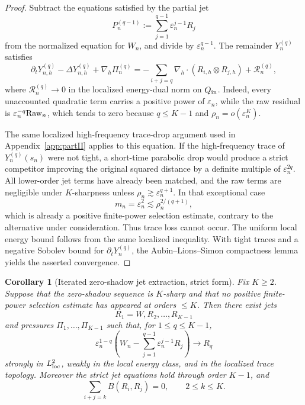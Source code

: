 \documentclass[11pt]{article}
\numberwithin{equation}{section}
\theoremstyle{plain}
\newtheorem{corollary}{Corollary}[section]
\theoremstyle{definition}
\theoremstyle{remark}
\newcommand{\nabh}{\nabla_h}
\newcommand{\calR}{\mathcal R}
\begin{document}
\begin{proof}
Subtract the equations satisfied by the partial jet
\[
        P_n^{(q-1)}:=\sum_{j=1}^{q-1}\varepsilon_n^{j-1}R_j
\]
from the normalized equation for \(W_n\), and divide by \(\varepsilon_n^{q-1}\).  The remainder
\(Y_n^{(q)}\) satisfies
\[
        \partial_tY_{n,h}^{(q)}-\Delta Y_{n,h}^{(q)}+\nabh\Pi_n^{(q)}
        =-
        \sum_{i+j=q}\nabh\cdot(R_{i,h}\otimes R_{j,h})+\calR_n^{(q)},
\]
where \(\calR_n^{(q)}\to0\) in the localized energy-dual norm on \(Q_{\rm in}\).  Indeed, every
unaccounted quadratic term carries a positive power of \(\varepsilon_n\), while the raw residual is
\(\varepsilon_n^{-q}{\rm Raw}_n\), which tends to zero because \(q\le K-1\) and
\(\rho_n=o(\varepsilon_n^K)\).

The same localized high-frequency trace-drop argument used in Appendix~\ref{app:partII} applies to this equation.
If the high-frequency trace of \(Y_n^{(q)}(s_n)\) were not tight, a short-time parabolic drop would
produce a strict competitor improving the original squared distance by a definite multiple of
\(\varepsilon_n^{2q}\).  All lower-order jet terms have already been matched, and the raw terms are
negligible under \(K\)-sharpness unless \(\rho_n\gtrsim\varepsilon_n^{q+1}\).  In that exceptional case
\[
        m_n=\varepsilon_n^2\lesssim \rho_n^{2/(q+1)},
\]
which is already a positive finite-power selection estimate, contrary to the alternative under
consideration.  Thus trace loss cannot occur.  The uniform local energy bound follows from the
same localized inequality.  With tight traces and a negative Sobolev bound for \(\partial_tY_n^{(q)}\),
the Aubin--Lions--Simon compactness lemma \cite{Simon1986} yields the asserted convergence.
\end{proof}

\begin{corollary}[Iterated zero-shadow jet extraction, strict form]
\label{pIII:cor:iterated-zero-shadow-jet-extraction-strict}
Fix \(K\ge2\).  Suppose that the zero-shadow sequence is \(K\)-sharp and that no positive finite-power
selection estimate has appeared at orders \(\le K\).  Then there exist jets
\[
        R_1=W,R_2,\ldots,R_{K-1}
\]
and pressures \(\Pi_1,\ldots,\Pi_{K-1}\) such that, for \(1\le q\le K-1\),
\[
        \varepsilon_n^{1-q}
        \left(W_n-\sum_{j=1}^{q-1}\varepsilon_n^{j-1}R_j\right)
        \to R_q
\]
strongly in \(L^2_{\rm loc}\), weakly in the local energy class, and in the localized trace topology.
Moreover the strict jet equations hold through order \(K-1\), and
\[
        \sum_{i+j=k}B(R_i,R_j)=0,\qquad 2\le k\le K.
\]
\end{corollary}
\end{document}

